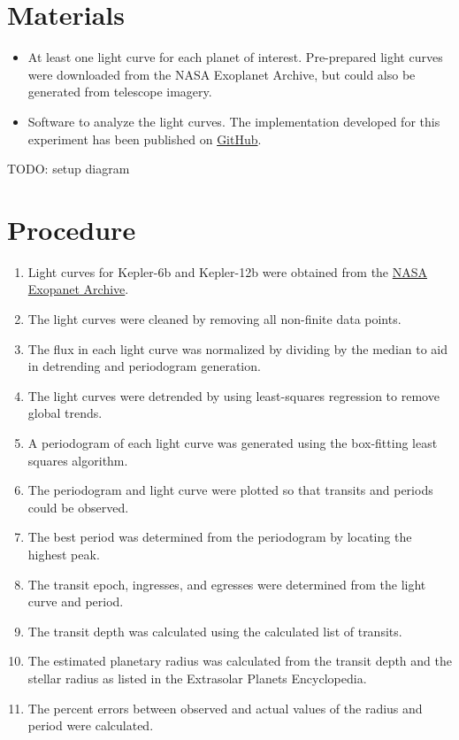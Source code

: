 \section{Materials}

\begin{itemize}
    \item At least one light curve for each planet of interest. Pre-prepared light curves were downloaded from the NASA Exoplanet Archive, but could
        also be generated from telescope imagery. \autocite{exoplanetArchive}
    \item Software to analyze the light curves. The implementation developed for this experiment has been published on \href{https://github.com/roguePanda/exoplanet-project}{GitHub}.
\end{itemize}

TODO: setup diagram

\section{Procedure}

\begin{enumerate}
    \item Light curves for Kepler-6b and Kepler-12b were obtained from the \href{http://exoplanetarchive.ipac.caltech.edu/}{NASA Exopanet Archive}.
    \item The light curves were cleaned by removing all non-finite data points.
    \item The flux in each light curve was normalized by dividing by the median to aid in detrending and periodogram generation.
    \item The light curves were detrended by using least-squares regression to remove global trends. \autocite{untrendy}
    \item A periodogram of each light curve was generated using the box-fitting least squares algorithm. \autocite{bls, pythonBls}
    \item The periodogram and light curve were plotted so that transits and periods could be observed.
    \item The best period was determined from the periodogram by locating the highest peak.
    \item The transit epoch, ingresses, and egresses were determined from the light curve and period.
    \item The transit depth was calculated using the calculated list of transits.
    \item The estimated planetary radius was calculated from the transit depth and the stellar radius as listed in the Extrasolar Planets Encyclopedia. \autocite{exoplanetEncyclopedia}
    \item The percent errors between observed and actual values of the radius and period were calculated.
\end{enumerate}
